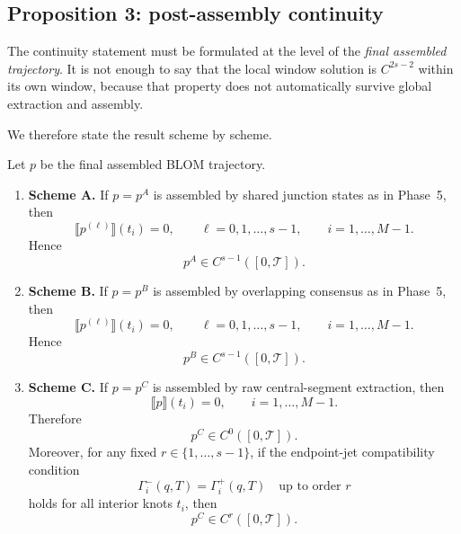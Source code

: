 \subsection{Proposition 3: post-assembly continuity}
\label{subsec:phase6_prop3}

The continuity statement must be formulated at the level of the \emph{final assembled trajectory}.
It is not enough to say that the local window solution is \(C^{2s-2}\) within its own window, because that property does not automatically survive global extraction and assembly.

We therefore state the result scheme by scheme.

\begin{proposition}
\label{prop:phase6_continuity}
Let \(p\) be the final assembled BLOM trajectory.

\begin{enumerate}
    \item \textbf{Scheme A.}
    If \(p=p^A\) is assembled by shared junction states as in Phase~5, then
    \begin{equation}
    \label{eq:phase6_schemeA_cont}
    \llbracket p^{(\ell)}\rrbracket(t_i)=0,
    \qquad
    \ell=0,1,\dots,s-1,
    \qquad
    i=1,\dots,M-1.
    \end{equation}
    Hence
    \[
    p^A\in C^{s-1}([0,\mathcal T]).
    \]

    \item \textbf{Scheme B.}
    If \(p=p^B\) is assembled by overlapping consensus as in Phase~5, then
    \begin{equation}
    \label{eq:phase6_schemeB_cont}
    \llbracket p^{(\ell)}\rrbracket(t_i)=0,
    \qquad
    \ell=0,1,\dots,s-1,
    \qquad
    i=1,\dots,M-1.
    \end{equation}
    Hence
    \[
    p^B\in C^{s-1}([0,\mathcal T]).
    \]

    \item \textbf{Scheme C.}
    If \(p=p^C\) is assembled by raw central-segment extraction, then
    \begin{equation}
    \label{eq:phase6_schemeC_C0}
    \llbracket p\rrbracket(t_i)=0,
    \qquad i=1,\dots,M-1.
    \end{equation}
    Therefore
    \[
    p^C\in C^0([0,\mathcal T]).
    \]
    Moreover, for any fixed \(r\in\{1,\dots,s-1\}\), if the endpoint-jet compatibility condition
    \begin{equation}
    \label{eq:phase6_schemeC_compatibility}
    \Gamma_i^{-}(q,T)=\Gamma_i^{+}(q,T)
    \quad\text{up to order }r
    \end{equation}
    holds for all interior knots \(t_i\), then
    \[
    p^C\in C^r([0,\mathcal T]).
    \]
\end{enumerate}
\end{proposition}

